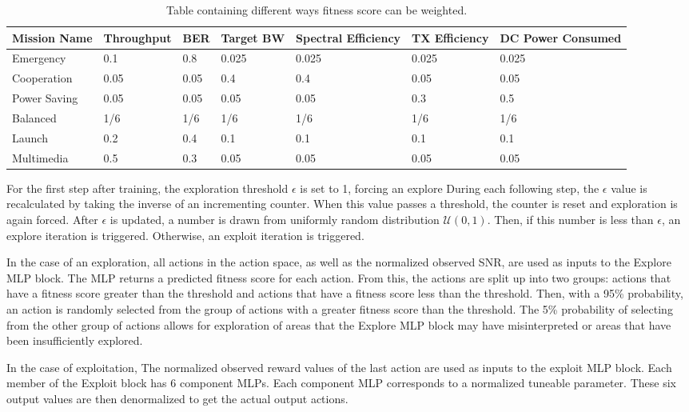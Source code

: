 \begin{table}[ht]
\centering
\begin{tabu} to 1.1\textwidth{|X[c]|X[c] X[c] X[c] X[c] X[c] X[c]|}
	\hline 
	Mission Name & Throughput&BER&Target BW&Spectral Efficiency&TX Efficiency&DC Power Consumed\\
	\hline
	Emergency& 0.1 &0.8&0.025&0.025&0.025&0.025 \\
	Cooperation&0.05&0.05&0.4&0.4&0.05&0.05\\
	Power Saving&0.05&0.05&0.05&0.05&0.3&0.5\\
	Balanced&1/6&1/6&1/6&1/6&1/6&1/6\\
	Launch&0.2&0.4&0.1&0.1&0.1&0.1\\
	Multimedia&0.5&0.3&0.05&0.05&0.05&0.05\\
	\hline
\end{tabu}
\caption{Table containing different ways fitness score can be weighted.}
\label{table:fitMissions}
\end{table}
\par For the first step after training, the exploration threshold $\epsilon$ is set to 1, forcing an explore During each following step, the $\epsilon$ value is recalculated by taking the inverse of an incrementing counter. When this value passes a threshold, the counter is reset and exploration is again forced. After $\epsilon$ is updated, a number is drawn from uniformly random distribution $\mathcal{U}(0,1)$. Then, if this number is less than $\epsilon$, an explore iteration is triggered. Otherwise, an exploit iteration is triggered.
\par In the case of an exploration, all actions in the action space, as well as the normalized observed SNR, are used as inputs to the Explore MLP block. The MLP returns a predicted fitness score for each action. From this, the actions are split up into two groups: actions that have a fitness score greater than the threshold and actions that have a fitness score less than the threshold. Then, with a 95\% probability, an action is randomly selected from the group of actions with a greater fitness score than the threshold. The 5\% probability of selecting from the other group of actions allows for exploration of areas that the Explore MLP block may have misinterpreted or areas that have been insufficiently explored.
\par In the case of exploitation, The normalized observed reward values of the last action are used as inputs to the exploit MLP block. Each member of the Exploit block has 6 component MLPs. Each component MLP corresponds to a normalized tuneable parameter. These six output values are then denormalized to get the actual output actions.
